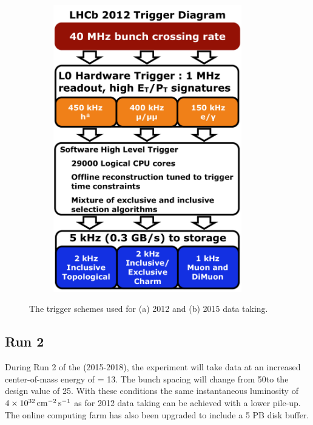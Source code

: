 \begin{figure}[!tb]
\begin{subfigure}{0.49\textwidth}
\includegraphics[width=0.9\textwidth]{figs/detector/trigger-run1.pdf}
\caption{}
\label{fig:trigger:run2}
\end{subfigure}
\caption{The trigger schemes used for (a) 2012 and (b) 2015 data taking.}
\label{fig:trigger}
\end{figure}

\subsection{\lhcb Run 2}
\label{sec:lhcb:lhcb-run2}

During Run 2 of the \lhc (2015-2018), the \lhcb experiment will take data at an increased center-of-mass energy of \sqs = 13\tev. The bunch spacing will change from 50\ns to the design value of 25\ns. With these conditions the same instantaneous luminosity of $4\times10^{32}\mathrm{ \,cm}^{-2}\mathrm{{\,s}}^{-1}$ as for 2012 data taking can be achieved with a lower pile-up. The online computing farm has also been upgraded to include a 5 PB disk buffer. 

